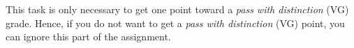 
This task is only necessary to get one point toward a \emph{pass with distinction} (VG) grade. Hence, if you do not want to get a \emph{pass with distinction} (VG) point, you can ignore this part of the assignment.
